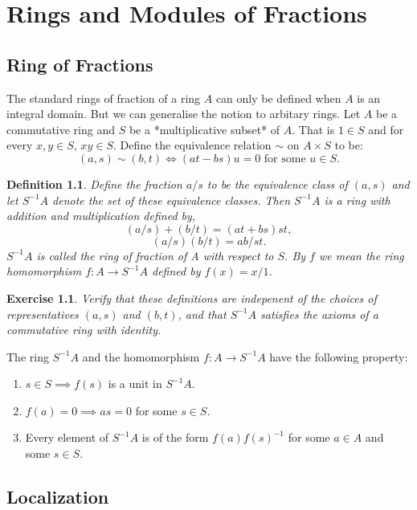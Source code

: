 \documentclass[]{report}
\newtheorem{defn}[theorem]{Definition}
\newtheorem{exercise}[theorem]{Exercise}
\begin{document}
\chapter{Rings and Modules of Fractions}

\section{Ring of Fractions}

The standard rings of fraction of a ring $A$ can only be defined when $A$ is an integral domain. But we can generalise the notion to arbitary rings. Let $A$ be a commutative ring and $S$ be a *multiplicative subset* of $A$. That is $1\in S$ and for every $x,y\in S$, $xy\in S$. Define the equivalence relation $\sim$ on $A\times S$ to be:
$$(a,s) \sim (b,t) \Leftrightarrow (at-bs)u=0 \text{ for some } u\in S.$$

\begin{defn}
    Define the fraction $a/s$ to be the equivalence class of $(a,s)$ and let $S^{-1}A$ denote the set of these equivalence classes. Then $S^{-1}A$ is a ring with addition and multiplication defined by,
$$(a/s) + (b/t) = (at+bs)st,$$
$$(a/s)(b/t) = ab/st.$$
$S^{-1}A$ is called the ring of fraction of A with respect to $S$. By $f$ we mean the ring homomorphism $f: A \rightarrow S^{-1}A$ defined by $f(x) = x/1$. 
\end{defn}

\begin{exercise}
    Verify that these definitions are indepenent of the choices of representatives $(a,s)$ and $(b,t)$, and that $S^{-1}A$ satisfies the axioms of a commutative ring with identity.
\end{exercise}

The ring $S^{-1}A$ and the homomorphism $f:A\rightarrow S^{-1}A$ have the following property:
\begin{enumerate}
    \item $s\in S \implies f(s)$ is a unit in $S^{-1}A$. 
    \item $f(a) = 0 \implies as = 0$ for some $s\in S$. 
    \item Every element of $S^{-1}A$ is of the form $f(a)f(s)^{-1}$ for some $a\in A$ and some $s\in S$. 
\end{enumerate}

\section{Localization}
\end{document}
